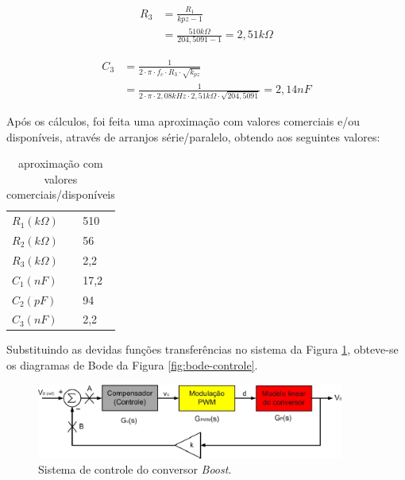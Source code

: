 \documentclass[a4paper]{article}
\begin{document}
{\begin{equation}
\label{eq:comp-r3}
\begin{split}
R_{3} & = \frac{R_{1}}{k{pz}-1} \\
& = \frac{510k\Omega}{204,5091-1} = 2,51k\Omega
\end{split}
\end{equation}

\begin{equation}
\label{eq:comp-c3}
\begin{split}
C_{3} & = \frac{1}{2 \cdot \pi \cdot f_{c} \cdot R_{3} \cdot \sqrt{k_{pz}}} \\
& = \frac{1}{2 \cdot \pi \cdot 2,08kHz \cdot 2,51k\Omega \cdot \sqrt{204,5091}} = 2,14nF
\end{split}
\end{equation}

Após os cálculos, foi feita uma aproximação com valores comerciais e/ou disponíveis, através de arranjos série/paralelo, obtendo aos seguintes valores:

\begin{table}[H]
\centering
\caption{aproximação com valores comerciais/disponíveis}
\label{tab:comp-com}
\begin{tabular}{ll}
$R_1 \left( k\Omega \right)$ & 510 \\
$R_2 \left( k\Omega \right)$ & 56 \\
$R_3 \left( k\Omega \right)$ & 2,2 \\
$C_1 \left( nF \right)$ & 17,2 \\
$C_2 \left( pF \right)$ & 94 \\
$C_3 \left( nF \right)$ & 2,2
\end{tabular}
\end{table}

Substituindo as devidas funções transferências no sistema da Figura \ref{fig:sistema-controle}, obteve-se os diagramas de Bode da Figura \ref{fig:bode-controle}.

\begin{figure}[H]
	\centering
	\includegraphics[width=0.9\textwidth]{sistema-controle.jpg}
	\caption{Sistema de controle do conversor \emph{Boost}.}
	\label{fig:sistema-controle}
\end{figure}

}
\end{document}
